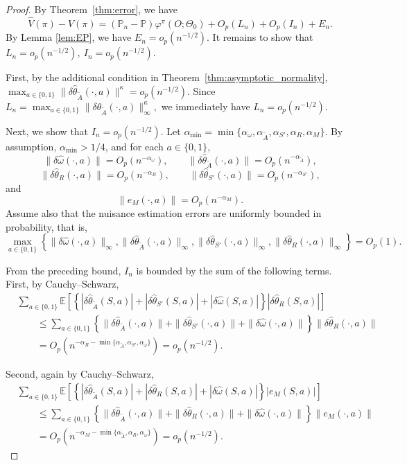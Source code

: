 \documentclass[12pt]{article}
\newcommand{\0}{\boldsymbol{0}}
\newcommand{\E}{\mathbb{E}}
\begin{document}
\begin{proof}
By Theorem~\ref{thm:error}, we have
\[
\widehat V(\pi)-V(\pi)=(\mathbb P_n-\mathbb P)\varphi^\pi(O;\Theta_0)+O_p(L_n)+O_p(I_n)+E_n .
\] By Lemma \ref{lem:EP}, we have $E_n=o_p(n^{-1/2})$. It remains to show that
\(
L_n=o_p(n^{-1/2}),\ I_n=o_p(n^{-1/2}).
\) 

First, by the additional condition in Theorem~\ref{thm:asymptotic_normality},
\(
\max_{a\in\{0,1\}}\|\delta \widehat \theta_{\widetilde A}(\cdot,a)\|^\kappa=o_p(n^{-1/2}).
\)
Since
\(
L_n=\max_{a\in\{0,1\}}\|\delta \widehat \theta_{\widetilde A}(\cdot,a)\|_\infty^\kappa,
\)
we immediately have
\(
L_n=o_p(n^{-1/2}).
\)

Next, we show that \(I_n=o_p(n^{-1/2})\). Let
\(
\alpha_{\min}=\min\{\alpha_\omega,\alpha_{\widetilde A},\alpha_{S'},\alpha_R,\alpha_M\}.
\)
By assumption, \(\alpha_{\min}>1/4\), and for each \(a\in\{0,1\}\),
\[
\|\delta\widehat\omega(\cdot,a)\|=O_p(n^{-\alpha_\omega}),
\qquad
\|\delta\widehat\theta_{\widetilde A}(\cdot,a)\|=O_p(n^{-\alpha_{\widetilde A}}),
\]
\[
\|\delta\widehat\theta_R(\cdot,a)\|=O_p(n^{-\alpha_R}),
\qquad
\|\delta\widehat\theta_{S'}(\cdot,a)\|=O_p(n^{-\alpha_{S'}}),
\]
and
\[
\|e_M(\cdot,a)\|=O_p(n^{-\alpha_M}).
\]
Assume also that the nuisance estimation errors are uniformly bounded in
probability, that is,
\[
\max_{a\in\{0,1\}}\left\{
\|\delta\widehat\omega(\cdot,a)\|_\infty,
\|\delta\widehat\theta_{\widetilde A}(\cdot,a)\|_\infty,
\|\delta\widehat\theta_{S'}(\cdot,a)\|_\infty,
\|\delta\widehat\theta_R(\cdot,a)\|_\infty
\right\}=O_p(1).
\]

From the preceding bound, \(I_n\) is bounded by the sum of the following terms.
First, by Cauchy--Schwarz,
\[
\begin{aligned}
&\sum_{a\in\{0,1\}}\E\!\left[
\left\{|\delta\widehat\theta_{\widetilde A}(S,a)|
+|\delta\widehat\theta_{S'}(S,a)|
+|\delta\widehat\omega(S,a)|\right\} |\delta\widehat\theta_R(S,a)|\right] \\
&\qquad\leq\sum_{a\in\{0,1\}}
\left\{\|\delta\widehat\theta_{\widetilde A}(\cdot,a)\|
+\|\delta\widehat\theta_{S'}(\cdot,a)\|
+\|\delta\widehat\omega(\cdot,a)\|\right\} \|\delta\widehat\theta_R(\cdot,a)\| \\
&\qquad=O_p\!\left(
n^{-\alpha_R-\min\{\alpha_{\widetilde A},\alpha_{S'},\alpha_\omega\}}
\right)=o_p(n^{-1/2}).
\end{aligned}
\]

Second, again by Cauchy--Schwarz,
\[
\begin{aligned}
&\sum_{a\in\{0,1\}}\mathbb E\!\left[\left\{
|\delta\widehat\theta_{\widetilde A}(S,a)|
+|\delta\widehat\theta_R(S,a)|
+|\delta\widehat\omega(S,a)|\right\}|e_M(S,a)| \right] \\
&\qquad\leq
\sum_{a\in\{0,1\}}
\left\{\|\delta\widehat\theta_{\widetilde A}(\cdot,a)\|
+\|\delta\widehat\theta_R(\cdot,a)\|
+\|\delta\widehat\omega(\cdot,a)\|\right\} \|e_M(\cdot,a)\| \\
&\qquad=O_p\!\left(n^{-\alpha_M-\min\{\alpha_{\widetilde A},\alpha_R,\alpha_\omega\}}
\right)=o_p(n^{-1/2}).
\end{aligned}
\]


\end{proof}
\end{document}

